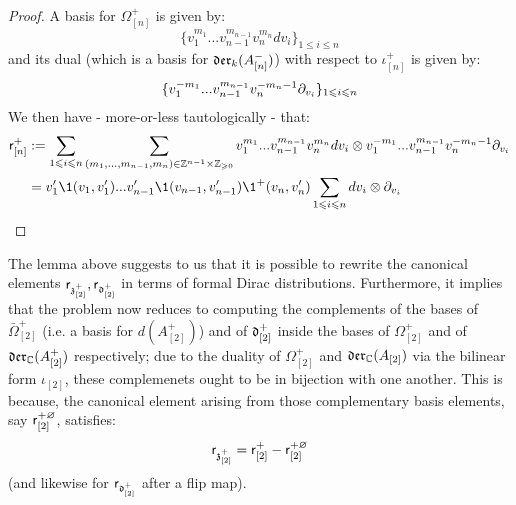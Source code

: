             \begin{proof}
                A basis for $\Omega_{[n]}^+$ is given by:
                    $$\{ v_1^{m_1} ... v_{n - 1}^{m_{n - 1}} v_n^{m_n} dv_i \}_{1 \leq i \leq n}$$
                and its dual (which is a basis for $\mathfrak{der}_k(A_{[n]}^-)$) with respect to $\iota_{[n]}^+$ is given by:
                    $$\{ v_1^{-m_1} ... v_{n - 1}^{m_{n - 1}} v_n^{-m_n - 1} \partial_{v_i} \}_{1 \leqslant i \leqslant n}$$
                We then have - more-or-less tautologically - that:
                    $$
                        \begin{aligned}
                            \sfr_{[n]}^+ & := \sum_{1 \leq i \leq n} \sum_{(m_1, ..., m_{n - 1}, m_n) \in \Z^{n - 1} \x \Z_{\geq 0}} v_1^{m_1} ... v_{n - 1}^{m_{n - 1}} v_n^{m_n} dv_i \tensor v_1^{-m_1} ... v_{n - 1}^{m_{n - 1}} v_n^{-m_n - 1} \del_{v_i}
                            \\
                            & = v_1' \1(v_1, v_1') ... v_{n - 1}' \1(v_{n - 1}, v_{n - 1}') \1^+(v_n, v_n') \sum_{1 \leq i \leq n} dv_i \tensor \del_{v_i}
                        \end{aligned}
                    $$
            \end{proof}
        The lemma above suggests to us that it is possible to rewrite the canonical elements $\mathsf{r}_{\mathfrak{z}_{[2]}^+}, \mathsf{r}_{\mathfrak{d}_{[2]}^+}$ in terms of formal Dirac distributions. Furthermore, it implies that the problem now reduces to computing the complements of the bases of $\bar{\Omega}_{[2]}^+$ (i.e. a basis for $d(A_{[2]}^+)$) and of $\mathfrak{d}_{[2]}^+$ inside the bases of $\Omega_{[2]}^+$ and of $\mathfrak{der}_{\mathbb{C}}(A_{[2]}^+)$ respectively; due to the duality of $\Omega_{[2]}^+$ and $\mathfrak{der}_{\mathbb{C}}(A_{[2]})$ via the bilinear form $\iota_{[2]}$, these complemenets ought to be in bijection with one another. This is because, the canonical element arising from those complementary basis elements, say $\mathsf{r}_{[2]}^{+ \varnothing}$, satisfies:
            $$\mathsf{r}_{\mathfrak{z}_{[2]}^+} = \mathsf{r}_{[2]}^+ - \mathsf{r}_{[2]}^{+ \varnothing}$$
        (and likewise for $\mathsf{r}_{\mathfrak{d}_{[2]}^+}$ after a flip map). 

